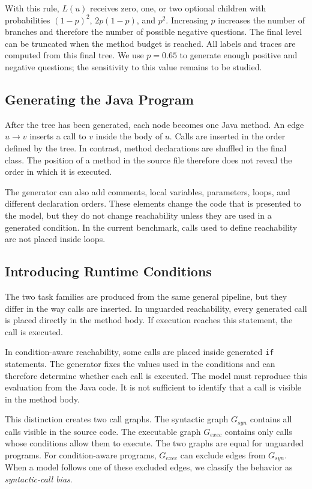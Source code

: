 With this rule, $L(u)$ receives zero, one, or two optional children with probabilities $(1-p)^2$, $2p(1-p)$, and $p^2$. Increasing $p$ increases the number of branches and therefore the number of possible negative questions. The final level can be truncated when the method budget is reached. All labels and traces are computed from this final tree. We use $p=0.65$ to generate enough positive and negative questions; the sensitivity to this value remains to be studied.

\subsection{Generating the Java Program}

After the tree has been generated, each node becomes one Java method. An edge $u \rightarrow v$ inserts a call to $v$ inside the body of $u$. Calls are inserted in the order defined by the tree. In contrast, method declarations are shuffled in the final class. The position of a method in the source file therefore does not reveal the order in which it is executed.

The generator can also add comments, local variables, parameters, loops, and different declaration orders. These elements change the code that is presented to the model, but they do not change reachability unless they are used in a generated condition. In the current benchmark, calls used to define reachability are not placed inside loops.

\subsection{Introducing Runtime Conditions}

The two task families are produced from the same general pipeline, but they differ in the way calls are inserted. In unguarded reachability, every generated call is placed directly in the method body. If execution reaches this statement, the call is executed.

In condition-aware reachability, some calls are placed inside generated \texttt{if} statements. The generator fixes the values used in the conditions and can therefore determine whether each call is executed. The model must reproduce this evaluation from the Java code. It is not sufficient to identify that a call is visible in the method body.

This distinction creates two call graphs. The syntactic graph $G_{\mathit{syn}}$ contains all calls visible in the source code. The executable graph $G_{\mathit{exec}}$ contains only calls whose conditions allow them to execute. The two graphs are equal for unguarded programs. For condition-aware programs, $G_{\mathit{exec}}$ can exclude edges from $G_{\mathit{syn}}$. When a model follows one of these excluded edges, we classify the behavior as \emph{syntactic-call bias}.

